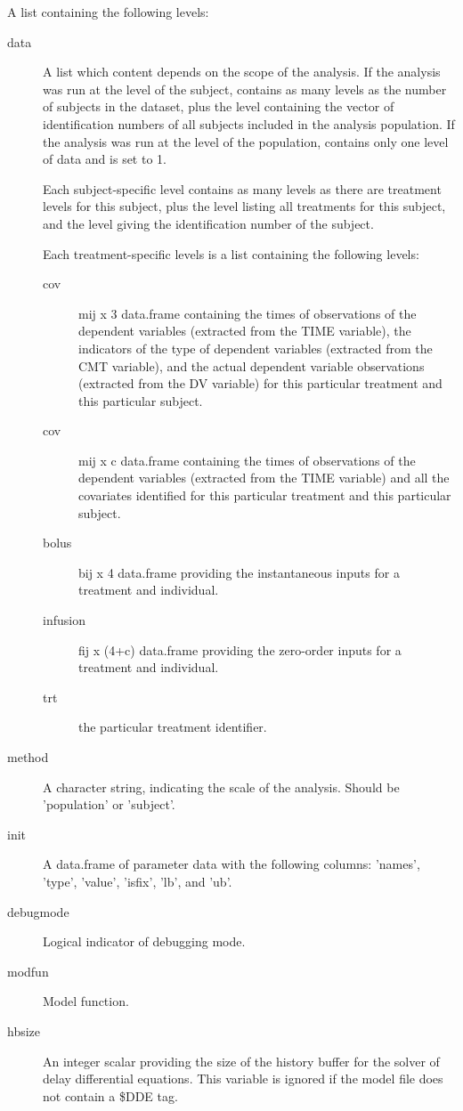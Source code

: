 \begin{Arguments}
\begin{ldescription}
\item[\code{problem}] A list containing the following levels:\begin{description}

\item[data] A list which content depends on the scope of the analysis. If 
the analysis was run at the level of the subject,  contains as 
many levels as the number of subjects in the dataset, plus the 
level containing the vector of identification numbers of all subjects 
included in the analysis population. If the analysis was run at the level 
of the population,  contains only one level of data and 
 is set to 1.

Each subject-specific level contains as many levels as there are treatment
levels for this subject, plus the  level listing all treatments
for this subject, and the  level giving the identification number
of the subject. 

Each treatment-specific levels is a list containing the following levels: 
\begin{description}

\item[cov] mij x 3 data.frame containing the times of observations of the
dependent variables (extracted from the TIME variable), the indicators
of the type of dependent variables (extracted from the CMT variable),
and the actual dependent variable observations (extracted from the 
DV variable) for this particular treatment and this particular 
subject.
\item[cov] mij x c data.frame containing the times of observations of 
the dependent variables (extracted from the TIME variable) and all the
covariates identified for this particular treatment and this 
particular subject.
\item[bolus] bij x 4 data.frame providing the instantaneous inputs 
for a treatment and individual.
\item[infusion] fij x (4+c) data.frame providing the zero-order inputs for
a treatment and individual.
\item[trt] the particular treatment identifier.
\end{description}


\item[method] A character string, indicating the scale of the analysis. Should
be 'population' or 'subject'.
\item[init] A data.frame of parameter data with the following columns:
'names', 'type', 'value', 'isfix', 'lb', and 'ub'.
\item[debugmode] Logical indicator of debugging mode.
\item[modfun] Model function.
\item[hbsize] An integer scalar providing the size of the history buffer for
the solver of delay differential equations. This variable is ignored if
the model file does not contain a \$DDE tag.


\end{description}
\end{ldescription}
\end{Arguments}
